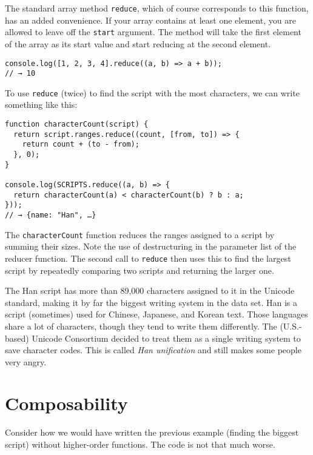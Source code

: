 The standard array method \lstinline`reduce`, which of course corresponds to this function, has an added convenience. If your array contains at least one element, you are allowed to leave off the \lstinline`start` argument. The method will take the first element of the array as its start value and start reducing at the second element.

\begin{lstlisting}
console.log([1, 2, 3, 4].reduce((a, b) => a + b));
// → 10
\end{lstlisting}
\noindent{}

To use \lstinline`reduce` (twice) to find the script with the most characters, we can write something like this:

\begin{lstlisting}
function characterCount(script) {
  return script.ranges.reduce((count, [from, to]) => {
    return count + (to - from);
  }, 0);
}

console.log(SCRIPTS.reduce((a, b) => {
  return characterCount(a) < characterCount(b) ? b : a;
}));
// → {name: "Han", …}
\end{lstlisting}
\noindent

The \lstinline`characterCount` function reduces the ranges assigned to a script by summing their sizes. Note the use of destructuring in the parameter list of the reducer function. The second call to \lstinline`reduce` then uses this to find the largest script by repeatedly comparing two scripts and returning the larger one.

The Han script has more than 89,000 characters assigned to it in the Unicode standard, making it by far the biggest writing system in the data set. Han is a script (sometimes) used for Chinese, Japanese, and Korean text. Those languages share a lot of characters, though they tend to write them differently. The (U.S.-based) Unicode Consortium decided to treat them as a single writing system to save character codes. This is called \emph{Han unification} and still makes some people very angry.

\section{Composability}

Consider how we would have written the previous example (finding the biggest script) without higher-order functions. The code is not that much worse.

